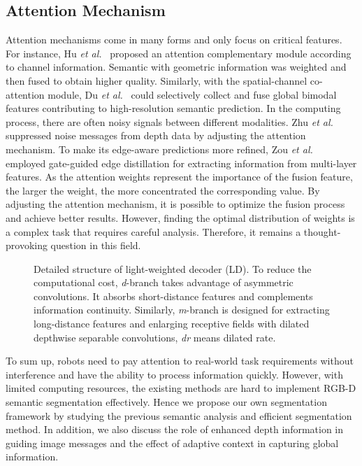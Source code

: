\documentclass[journal,twoside,web]{ieeecolor}
\begin{document}
\subsection{Attention Mechanism}
Attention mechanisms come in many forms and only focus on critical features. For instance, Hu \textit{et al.}~\cite{ACNet} proposed an attention complementary module according to channel information. Semantic with geometric information was weighted and then fused to obtain higher quality. Similarly, with the spatial-channel co-attention module, Du \textit{et al.}~\cite{ Gated_Fusion } could selectively collect and fuse global bimodal features contributing to high-resolution semantic prediction. In the computing process, there are often noisy signals between different modalities. Zhu \textit{et al.}~\cite{ CMANet } suppressed noise messages from depth data by adjusting the attention mechanism. To make its edge-aware predictions more refined, Zou \textit{et al.}~\cite{ GED } employed gate-guided edge distillation for extracting information from multi-layer features.  As the attention weights represent the importance of the fusion feature, the larger the weight, the more concentrated the corresponding value. 
By adjusting the attention mechanism, it is possible to optimize the fusion process and achieve better results. However, finding the optimal distribution of weights is a complex task that requires careful analysis. Therefore, it remains a thought-provoking question in this field.
\begin{figure}[!t]
	\centering 	
	\caption{Detailed structure of light-weighted decoder (LD). To reduce the computational cost, \textit{d}-branch takes advantage of asymmetric convolutions. It absorbs short-distance features and complements information continuity. Similarly, \textit{m}-branch is designed for extracting long-distance features and enlarging receptive fields with dilated depthwise separable convolutions, \textit{dr} means dilated rate.}
	\label{spatial}
\end{figure}

To sum up, robots need to pay attention to real-world task requirements without interference and have the ability to process information quickly. However, with limited computing resources, the existing methods are hard to implement RGB-D semantic segmentation effectively. Hence we propose our own segmentation framework by studying the previous semantic analysis and efficient segmentation method. In addition, we also discuss the role of enhanced depth information in guiding image messages and the effect of adaptive context in capturing global information.
\end{document}
